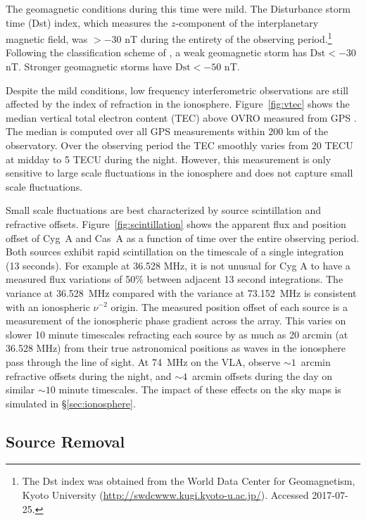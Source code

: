 \documentclass[twocolumn]{aastex61}
\begin{document}
The geomagnetic conditions during this time were mild. The Disturbance storm time (Dst) index, which
measures the $z$-component of the interplanetary magnetic field, was
$>-30$ nT during the entirety of the observing period.\footnote{
    The Dst index was obtained from the World Data Center for Geomagnetism, Kyoto University
    (\url{http://swdcwww.kugi.kyoto-u.ac.jp/}). Accessed 2017-07-25.
}
Following the classification scheme of \citet{2008GMS...181.....K}, a weak geomagnetic storm has
$\text{Dst} < -30$ nT. Stronger geomagnetic storms have $\text{Dst} < -50$ nT.

Despite the mild conditions, low frequency interferometric observations are still affected by the
index of refraction in the ionosphere.  Figure~\ref{fig:vtec} shows the median vertical total
electron content (TEC) above OVRO measured from GPS \citep{1999JASTP..61.1205I}. The median is
computed over all GPS measurements within 200 km of the observatory. Over the observing period the
TEC smoothly varies from 20 TECU at midday to 5 TECU during the night. However, this measurement is
only sensitive to large scale fluctuations in the ionosphere and does not capture small scale
fluctuations.

Small scale fluctuations are best characterized by source scintillation and refractive offsets.
Figure~\ref{fig:scintillation} shows the apparent flux and position offset of Cyg~A and Cas~A as a
function of time over the entire observing period. Both sources exhibit rapid scintillation on the
timescale of a single integration (13 seconds). For example at 36.528 MHz, it is not unusual for Cyg
A to have a measured flux variations of 50\% between adjacent 13 second integrations.  The variance
at 36.528~MHz compared with the variance at 73.152~MHz is consistent with an ionospheric $\nu^{-2}$
origin. The measured position offset of each source is a measurement of the ionospheric phase
gradient across the array.  This varies on slower 10 minute timescales refracting each source by as
much as 20 arcmin (at 36.528 MHz) from their true astronomical positions as waves in the ionosphere
pass through the line of sight. At 74~MHz on the VLA, \citet{2007ApJS..172..686K} observe $\sim
1$~arcmin refractive offsets during the night, and $\sim 4$~arcmin offsets during the day on similar
$\sim10$ minute timescales.  The impact of these effects on the sky maps is simulated in
\S\ref{sec:ionosphere}.

\subsection{Source Removal}\label{sec:source-removal}
\end{document}
